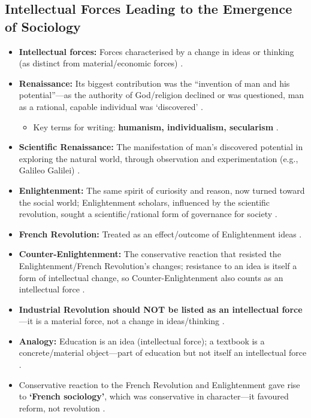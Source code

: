 \subsection{Intellectual Forces Leading to the Emergence of Sociology}

\begin{KeyConcept}
\begin{itemize}
    \item \textbf{Intellectual forces:} Forces characterised by a change in ideas or thinking (as distinct from material/economic forces) .
    \item \textbf{Renaissance:} Its biggest contribution was the ``invention of man and his potential''---as the authority of God/religion declined or was questioned, man as a rational, capable individual was `discovered' .
    \begin{itemize}
        \item Key terms for writing: \textbf{humanism, individualism, secularism} .
    \end{itemize}
    \item \textbf{Scientific Renaissance:} The manifestation of man's discovered potential in exploring the natural world, through observation and experimentation (e.g., Galileo Galilei) .
    \item \textbf{Enlightenment:} The same spirit of curiosity and reason, now turned toward the social world; Enlightenment scholars, influenced by the scientific revolution, sought a scientific/rational form of governance for society .
    \item \textbf{French Revolution:} Treated as an effect/outcome of Enlightenment ideas .
    \item \textbf{Counter-Enlightenment:} The conservative reaction that resisted the Enlightenment/French Revolution's changes; resistance to an idea is itself a form of intellectual change, so Counter-Enlightenment also counts as an intellectual force .
\end{itemize}
\end{KeyConcept}

\begin{CriticalPoint}
\begin{itemize}
    \item \textbf{Industrial Revolution should NOT be listed as an intellectual force}---it is a material force, not a change in ideas/thinking .
    \item \textbf{Analogy:} Education is an idea (intellectual force); a textbook is a concrete/material object---part of education but not itself an intellectual force .
    \item Conservative reaction to the French Revolution and Enlightenment gave rise to \textbf{`French sociology'}, which was conservative in character---it favoured reform, not revolution .
\end{itemize}
\end{CriticalPoint}

